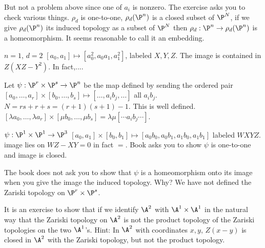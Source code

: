 But not a problem above since one of $a_i$ is nonzero. The exercise asks you to check various things. $\rho_d$ is one-to-one, $\rho_d(\P^n)$ is a closed subset of $\P^N$, if we give $\rho_d(\P^n)$ its induced topology as a subset of $\P^N$ then $\rho_d: \P^n \to \rho_d(\P^n)$ is a homeomorphism. It seems reasonable to call it an embedding.

\begin{ex}
$n=1$, $d=2$
$[a_0,a_1] \mapsto [a_0^2,a_0a_1,a_1^2]$, labeled $X,Y,Z$. The image is contained in $Z(XZ-Y^2)$. In fact,.... \xqed
\end{ex}

\begin{ex}
Let $\psi: \P^r \times \P^s \to \P^n$ be the map defined by sending the ordered pair $[a_0,\ldots,a_r] \times [b_0,\ldots,b_s] \mapsto [\ldots,a_ib_j,\ldots]$ all $a_ib_j$. $N= rs+r+s= (r+1)(s+1)-1$. This is well defined. $[\lambda a_0,\ldots,\lambda a_r] \times [\mu b_0,\ldots,\mu b_s]= \lambda \mu [\cdots a_ib_j \cdots]$. \xqed
\end{ex}


\begin{ex}
$\psi: \P^1 \times \P^1 \to \P^3$
$[a_0,a_1] \times [b_0,b_1] \mapsto [a_0b_0,a_0b_1,a_1b_0,a_1b_1]$ labeled $WXYZ$.
image lies on $WZ-XY=0$ in fact $=$. Book asks you to show $\psi$ is one-to-one and image is closed.  \xqed
\end{ex}


The book does not ask you to show that $\psi$ is a homeomorphism onto its image when you give the image the induced topology. Why? We have not defined the Zariski topology on $\P^r \times \P^s$. 

It is an exercise to show that if we identify $\A^2$ with $\A^1 \times \A^1$ in the natural way that the Zariski topology on $\A^2$ is not the product topology of the Zariski topologies on the two $\A^1$'s. Hint: In $\A^2$ with coordinates $x,y$, $Z(x-y)$ is closed in $\A^2$ with the Zariski topology, but not the product topology. 








































